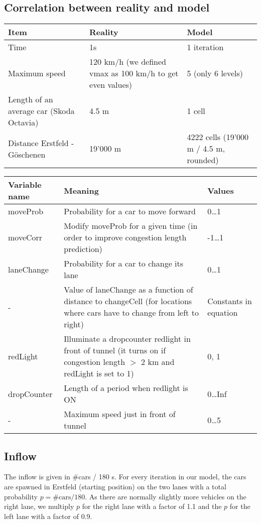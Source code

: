 
\subsection{Correlation between reality and model}


\begin{tabular}{p{} p{} p{}}
\textbf{Item}			& \textbf{Reality}	&  \textbf{Model}\\
\midrule
Time			& 1s		& 1 iteration\\
Maximum speed	& 120  km/h (we defined vmax as 100 km/h to get even values) & 5 (only 6 levels)\\
Length of an average car (Skoda Octavia) & 4.5 m & 1 cell\\
Distance Erstfeld - Göschenen & 19'000 m & 4222 cells (19'000 m / 4.5 m, rounded)
\end{tabular}

\vspace*{1.5cm}
\begin{tabular}{p{} p{} p{}}
\textbf{Variable name}	& \textbf{Meaning}	& \textbf{Values} \\
\midrule
moveProb & Probability for a car to move forward & 0\ldots 1  \\
moveCorr & Modify moveProb for a given time (in order to improve congestion length prediction) &  -1\ldots 1\\
laneChange & Probability for a car to change its lane & 0\ldots 1\\
- & Value of laneChange as a function of distance to changeCell (for locations where cars have to change from left to right) & Constants in equation\\
redLight & Illuminate a dropcounter redlight in front of tunnel (it turns on if congestion length $>$ 2 km and redLight is set to 1) & 0, 1\\
dropCounter & Length of a period when redlight is ON & 0\ldots Inf \\
- & Maximum speed just in front of tunnel & 0\ldots 5
\end{tabular}


\subsection{Inflow}
The inflow is given in \#cars / 180 s. For every iteration in our model, the cars are spawned in Erstfeld (starting position) on the two lanes with a total probability $p = \#\textrm{cars} / 180$. As there are normally slightly more vehicles on the right lane, we multiply $p$ for the right lane with a factor of 1.1 and the $p$ for the left lane with a factor of 0.9.

